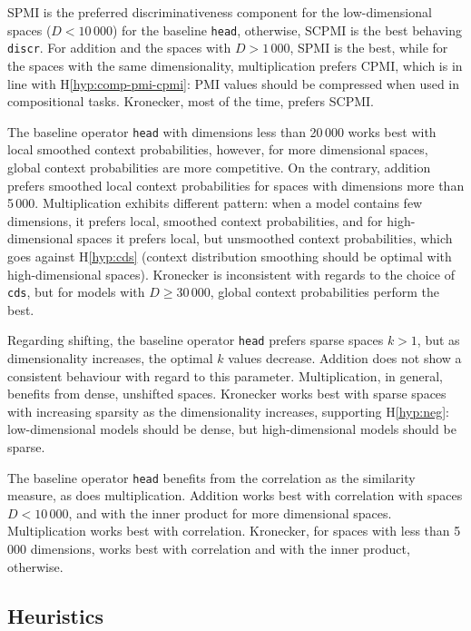 SPMI is the preferred discriminativeness component for the low-dimensional spaces ($D < 10\,000$) for the baseline \texttt{head}, otherwise, SCPMI is the best behaving \texttt{discr}. For addition and the spaces with $D > 1\,000$, SPMI is the best, while for the spaces with the same dimensionality, multiplication prefers CPMI, which is in line with H\ref{hyp:comp-pmi-cpmi}: PMI values should be compressed when used in compositional tasks. Kronecker, most of the time, prefers SCPMI.

The baseline operator \texttt{head} with dimensions less than 20\,000 works best with local smoothed context probabilities, however, for more dimensional spaces, global context probabilities are more competitive. On the contrary, addition prefers smoothed local context probabilities for spaces with dimensions more than 5\,000. Multiplication exhibits different pattern: when a model contains few dimensions, it prefers local, smoothed context probabilities, and for high-dimensional spaces it prefers local, but unsmoothed context probabilities, which goes against H\ref{hyp:cds} (context distribution smoothing should be optimal with high-dimensional spaces). Kronecker is inconsistent with regards to the choice of \texttt{cds}, but for models with $D \geq 30\,000$, global context probabilities perform the best.

Regarding shifting, the baseline operator \texttt{head} prefers sparse spaces $k > 1$, but as dimensionality increases, the optimal $k$ values decrease. Addition does not show a consistent behaviour with regard to this parameter. Multiplication, in general, benefits from dense, unshifted spaces. Kronecker works best with sparse spaces with increasing sparsity as the dimensionality increases, supporting H\ref{hyp:neg}: low-dimensional models should be dense, but high-dimensional models should be sparse.

The baseline operator \texttt{head} benefits from the correlation as the similarity measure, as does multiplication. Addition works best with correlation with spaces $D < 10\,000$, and with the inner product for more dimensional spaces. Multiplication works best with correlation. Kronecker, for spaces with less than 5\,000 dimensions, works best with correlation and with the inner product, otherwise.

\subsection{Heuristics}
\label{sec:heuristics-phraserel}

